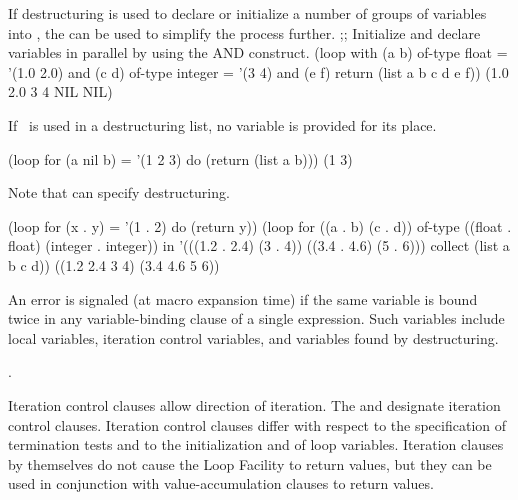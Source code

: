  
 
If destructuring is used to declare or initialize a number of groups
of variables into , the   can be used
to simplify the process further.
\code
;; Initialize and declare variables in parallel by using the AND construct.\kern-7pt
 (loop with (a b) of-type float = '(1.0 2.0)
       and (c d) of-type integer = '(3 4)
       and (e f)
       return (list a b c d e f))
\EV (1.0 2.0 3 4 NIL NIL)
\endcode
{} 
 
 
If \nil\ is used in a destructuring list, no variable is provided for
its place.
 
\code
 (loop for (a nil b) = '(1 2 3)
       do (return (list a b)))
\EV (1 3)
\endcode
 
Note that 
can specify destructuring.
 
\code
 (loop for (x . y) = '(1 . 2)
       do (return y))
 (loop for ((a . b) (c . d)) of-type ((float . float) (integer . integer)) in
       '(((1.2 . 2.4) (3 . 4)) ((3.4 . 4.6) (5 . 6)))
       collect (list a b c d))
\EV ((1.2 2.4 3 4) (3.4 4.6 5 6))
\endcode
 
An error  is signaled (at macro expansion time)
if the same variable is bound twice in any variable-binding
clause of a single  expression.  Such variables include
local variables, iteration control variables, and variables found by
destructuring.

\endsubsubsection%


\Seesection\TraversalRules.

\endsubsubsection%

\endsubsection%

 

Iteration control clauses allow direction of  iteration.
The   and 
designate iteration control clauses.
Iteration control clauses differ with respect to the specification of
termination tests and to the initialization and 
of loop variables.  Iteration clauses by themselves
do not cause the Loop Facility to return values, but they
can be used in conjunction with value-accumulation clauses to
return values.  
 
